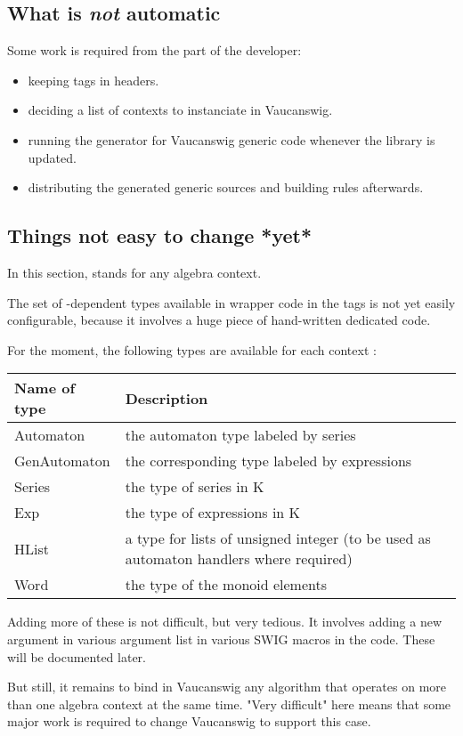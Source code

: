 \subsection{What is \emph{not} automatic}

Some work is required from the part of the developer:
\begin{itemize}
\item keeping  tags in \Vauc headers.

\item deciding a list of contexts to instanciate in Vaucanswig.

\item running the generator for Vaucanswig generic code whenever
  the \Vauc library is updated.

\item distributing the generated generic sources and building rules
  afterwards.
\end{itemize}

\subsection{Things not easy to change *yet*}

In this section,  stands for any algebra context.

The set of  -dependent types available in wrapper code in the
 tags is not yet easily configurable, because it
involves a huge piece of hand-written dedicated code.

For the moment, the following types are available for each
context :

\begin{tabular}{|l|p{.6\linewidth}|}
  \hline
   Name of type   & Description\\
  \hline
     Automaton	& the automaton type labeled by series \\
     GenAutomaton& the corresponding type labeled by expressions \\
     Series	& the type of series in K \\
     Exp	& the type of expressions in K \\
     HList	& a type for lists of unsigned integer
                  (to be used as automaton handlers where required) \\
     Word	& the type of the monoid elements \\
  \hline
\end{tabular}

Adding more of these is not difficult, but very tedious. It involves
adding a new argument in various argument list in various SWIG macros
in the code. These will be documented later.

But still, it remains  to bind in Vaucanswig
any algorithm that operates on more than one algebra context at the
same time. "Very difficult" here means that some major work is
required to change Vaucanswig to support this case.



